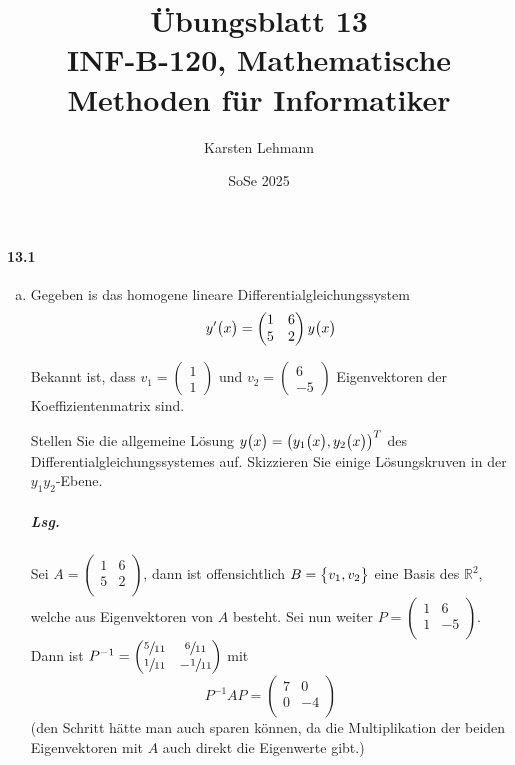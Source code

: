 \documentclass{scrreprt}
\author{Karsten Lehmann}
\date{SoSe 2025}
\title{Übungsblatt 13\\INF-B-120, Mathematische Methoden für Informatiker}
\begin{document}
\paragraph{13.1}
\begin{enumerate}[(a)]
\item Gegeben is das homogene lineare Differentialgleichungssystem
  \[
    y'\qty\big(x) = \begin{pmatrix}
      1 & 6 \\
      5 & 2 \\
    \end{pmatrix}y\qty\big(x)
  \]

  Bekannt ist, dass $v_1 = \begin{pmatrix} 1 \\ 1 \end{pmatrix}$ und
  $v_2 = \begin{pmatrix} 6 \\ -5 \end{pmatrix}$ Eigenvektoren der
  Koeffizientenmatrix sind.

  Stellen Sie die allgemeine Lösung $y\qty\big(x) = \qty(y_1\qty\big(x), y_2\qty\big(x))^T$
  des Differentialgleichungssystemes auf.
  Skizzieren Sie einige Lösungskruven in der $y_1y_2$-Ebene.

  \subparagraph{Lsg.} Sei $A = \begin{pmatrix}
      1 & 6 \\
      5 & 2 \\
  \end{pmatrix}$, dann ist offensichtlich $B = \qty\big{v_1, v_2}$ eine Basis
  des $\mathbb{R}^2$, welche aus Eigenvektoren von $A$ besteht.
  Sei nun weiter $P = \begin{pmatrix}
    1 & 6  \\
    1 & -5 \\
  \end{pmatrix}$.
  Dann ist $P^{-1} = \begin{pmatrix}
    \sfrac{5}{11} & \sfrac{6}{11}  \\
    \sfrac{1}{11} & -\sfrac{1}{11} \\
  \end{pmatrix}$
  mit
  \[
    P^{-1}AP = \begin{pmatrix}
      7 & 0  \\
      0 & -4 \\
    \end{pmatrix}
  \]
  (den Schritt hätte man auch sparen können, da die Multiplikation der beiden
  Eigenvektoren mit $A$ auch direkt die Eigenwerte gibt.)


\end{enumerate}
\end{document}
